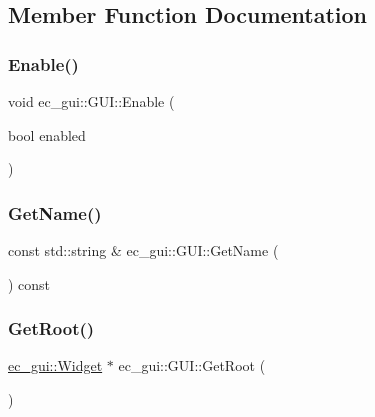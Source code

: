 \subsection{Member Function Documentation}
\mbox{\label{classec__gui_1_1_g_u_i_a01a71e281135c7c7e1c8ac331a6124e6}} 
\subsubsection{\texorpdfstring{Enable()}{Enable()}}
{\footnotesize\ttfamily void ec\+\_\+gui\+::\+G\+U\+I\+::\+Enable (\begin{DoxyParamCaption}\item[{bool}]{enabled }\end{DoxyParamCaption})}

\mbox{\label{classec__gui_1_1_g_u_i_a9714da27dee267066818446c6b42f7cd}} 
\subsubsection{\texorpdfstring{Get\+Name()}{GetName()}}
{\footnotesize\ttfamily const std\+::string \& ec\+\_\+gui\+::\+G\+U\+I\+::\+Get\+Name (\begin{DoxyParamCaption}{ }\end{DoxyParamCaption}) const}

\mbox{\label{classec__gui_1_1_g_u_i_a2928769621adeaf68920c3e76e9c81a1}} 
\subsubsection{\texorpdfstring{Get\+Root()}{GetRoot()}}
{\footnotesize\ttfamily \mbox{\hyperlink{classec__gui_1_1_widget}{ec\+\_\+gui\+::\+Widget}} $\ast$ ec\+\_\+gui\+::\+G\+U\+I\+::\+Get\+Root (\begin{DoxyParamCaption}{ }\end{DoxyParamCaption})}

